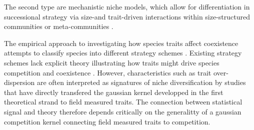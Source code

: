 \documentclass[a4paper,11pt]{article}
\begin{document}
The second type are mechanistic niche models, which allow for
differentiation in successional strategy via size-and
trait-driven interactions within size-structured communities or
meta-communities
\citep{Huston-1987,Kohyama-1993,Moorcroft-2001,Falster-2011}.

The empirical approach to investigating how species traits affect
coexistence attempts to classify species into different strategy
schemes
\citep{Grime-1974,Grime-1979,Southwood-1977,Weiher-1999,Westoby-2002}.
%
%
Existing strategy schemes lack explicit theory illustrating how traits
might drive species competition and coexistence \citep{Adler-2013}.
However, characteristics such as trait over-dispersion are often
interpreted as
signatures of niche diversification \citep[e.g.][]{Kraft-2008} by
 studies that have directly transfered the gaussian kernel developped in the
first theoretical strand to field measured traits.
The connection between statistical signal and theory therefore depends
critically on the generalitty of a gaussian competition kernel
connecting field measured traits to competition.
\end{document}
